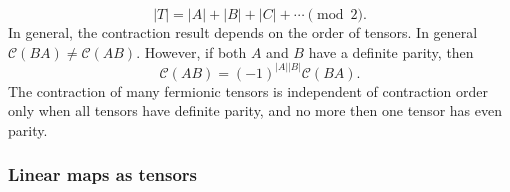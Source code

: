 \documentclass[11pt]{article}
\begin{document}
\begin{equation}
    |T| = |A| + |B| + |C| + \cdots \pmod{2}. 
\end{equation}
In general, the contraction result depends on the order of tensors. In general $\mathcal{C}(BA) \ne \mathcal{C}(AB)$. 
However, if both $A$ and $B$ have a definite parity, then
\begin{equation}
    \mathcal{C}(AB) = (-1)^{|A||B|} \mathcal{C}(BA).
\end{equation}
The contraction of many fermionic tensors is independent of contraction order only when all tensors have definite parity, and no more then one tensor has even parity. 

\subsubsection{Linear maps as tensors}
\end{document}
